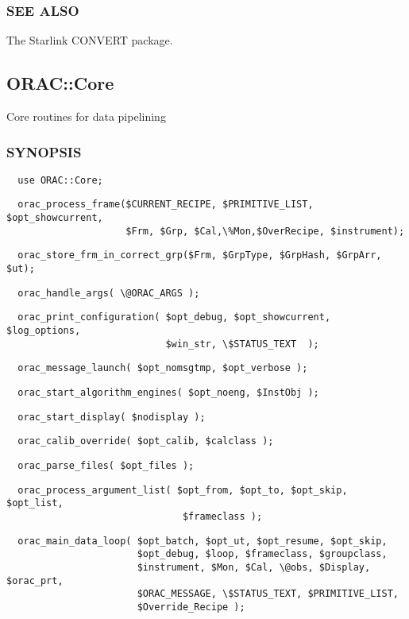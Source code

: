 \subsubsection*{SEE ALSO\label{ORAC::Convert_SEE_ALSO}}

The Starlink CONVERT package.


\subsection{ORAC::Core\label{ORAC::Core}}

Core routines for data pipelining

\subsubsection*{SYNOPSIS\label{ORAC::Core_SYNOPSIS}}\begin{verbatim}
  use ORAC::Core;
\end{verbatim}
\begin{verbatim}
  orac_process_frame($CURRENT_RECIPE, $PRIMITIVE_LIST, $opt_showcurrent,
                     $Frm, $Grp, $Cal,\%Mon,$OverRecipe, $instrument);
\end{verbatim}
\begin{verbatim}
  orac_store_frm_in_correct_grp($Frm, $GrpType, $GrpHash, $GrpArr, $ut);
\end{verbatim}
\begin{verbatim}
  orac_handle_args( \@ORAC_ARGS );
\end{verbatim}
\begin{verbatim}
  orac_print_configuration( $opt_debug, $opt_showcurrent, $log_options,
                            $win_str, \$STATUS_TEXT  );
\end{verbatim}
\begin{verbatim}
  orac_message_launch( $opt_nomsgtmp, $opt_verbose );
\end{verbatim}
\begin{verbatim}
  orac_start_algorithm_engines( $opt_noeng, $InstObj );
\end{verbatim}
\begin{verbatim}
  orac_start_display( $nodisplay );
\end{verbatim}
\begin{verbatim}
  orac_calib_override( $opt_calib, $calclass );
\end{verbatim}
\begin{verbatim}
  orac_parse_files( $opt_files );
\end{verbatim}
\begin{verbatim}
  orac_process_argument_list( $opt_from, $opt_to, $opt_skip, $opt_list,
                               $frameclass );
\end{verbatim}
\begin{verbatim}
  orac_main_data_loop( $opt_batch, $opt_ut, $opt_resume, $opt_skip, 
                       $opt_debug, $loop, $frameclass, $groupclass, 
                       $instrument, $Mon, $Cal, \@obs, $Display, $orac_prt,
                       $ORAC_MESSAGE, \$STATUS_TEXT, $PRIMITIVE_LIST,
                       $Override_Recipe );
\end{verbatim}

